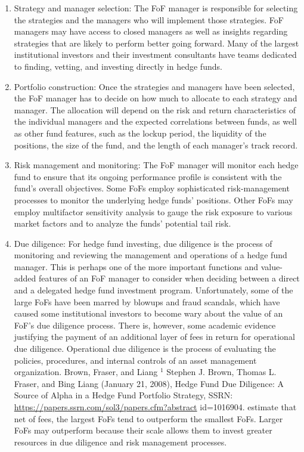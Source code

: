\documentclass[11pt]{article}
\begin{document}
\begin{enumerate}
  \item Strategy and manager selection: The FoF manager is responsible for selecting the strategies and the managers who will implement those strategies. FoF managers may have access to closed managers as well as insights regarding strategies that are likely to perform better going forward. Many of the largest institutional investors and their investment consultants have teams dedicated to finding, vetting, and investing directly in hedge funds.

  \item Portfolio construction: Once the strategies and managers have been selected, the FoF manager has to decide on how much to allocate to each strategy and manager. The allocation will depend on the risk and return characteristics of the individual managers and the expected correlations between funds, as well as other fund features, such as the lockup period, the liquidity of the positions, the size of the fund, and the length of each manager's track record.

  \item Risk management and monitoring: The FoF manager will monitor each hedge fund to ensure that its ongoing performance profile is consistent with the fund's overall objectives. Some FoFs employ sophisticated risk-management processes to monitor the underlying hedge funds' positions. Other FoFs may employ multifactor sensitivity analysis to gauge the risk exposure to various market factors and to analyze the funds' potential tail risk.

  \item Due diligence: For hedge fund investing, due diligence is the process of monitoring and reviewing the management and operations of a hedge fund manager. This is perhaps one of the more important functions and value-added features of an FoF manager to consider when deciding between a direct and a delegated hedge fund investment program. Unfortunately, some of the large FoFs have been marred by blowups and fraud scandals, which have caused some institutional investors to become wary about the value of an FoF's due diligence process. There is, however, some academic evidence justifying the payment of an additional layer of fees in return for operational due diligence. Operational due diligence is the process of evaluating the policies, procedures, and internal controls of an asset management organization. Brown, Fraser, and Liang ${ }^{1}$ Stephen J. Brown, Thomas L. Fraser, and Bing Liang (January 21, 2008), Hedge Fund Due Diligence: A Source of Alpha in a Hedge Fund Portfolio Strategy, SSRN: \href{https://papers.ssrn.com/sol3/papers.cfm?abstract}{https://papers.ssrn.com/sol3/papers.cfm?abstract} id=1016904. estimate that net of fees, the largest FoFs tend to outperform the smallest FoFs. Larger FoFs may outperform because their scale allows them to invest greater resources in due diligence and risk management processes.

\end{enumerate}
\end{document}
